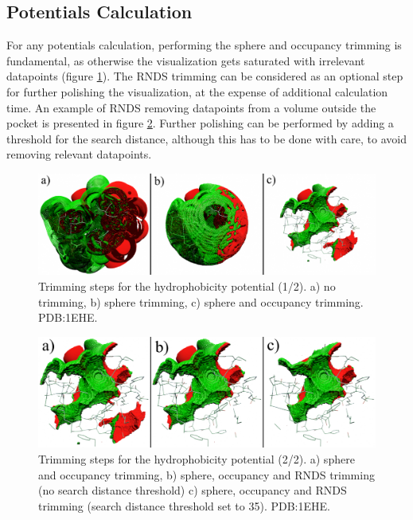   \subsection{Potentials Calculation}
    For any potentials calculation, performing the sphere and occupancy trimming is fundamental, as otherwise the visualization gets saturated with irrelevant datapoints (figure \ref{fig:results/trimming_0}). The RNDS trimming can be considered as an optional step for further polishing the visualization, at the expense of additional calculation time. An example of RNDS removing datapoints from a volume outside the pocket is presented in figure \ref{fig:results/trimming_1}. Further polishing can be performed by adding a threshold for the search distance, although this has to be done with care, to avoid removing relevant datapoints.

    \begin{figure}[H]
      \centering
      \includegraphics[width=1\textwidth]{figures/results/trimming_0.png}
      \caption{\label{fig:results/trimming_0} Trimming steps for the hydrophobicity potential (1/2). a) no trimming, b) sphere trimming, c) sphere and occupancy trimming. PDB:1EHE.}
    \end{figure}

    \begin{figure}[H]
      \centering
      \includegraphics[width=1\textwidth]{figures/results/trimming_1.png}
      \caption{\label{fig:results/trimming_1} Trimming steps for the hydrophobicity potential (2/2). a) sphere and occupancy trimming, b) sphere, occupancy and RNDS trimming (no search distance threshold) c) sphere, occupancy and RNDS trimming (search distance threshold set to 35). PDB:1EHE.}
    \end{figure}

